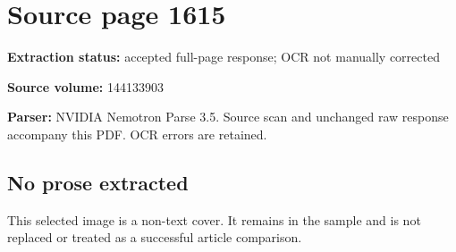 \clearpage
\section{Source page 1615}
\textbf{Extraction status:} accepted full-page response; OCR not manually corrected\par
\textbf{Source volume:} 144133903\par
\textbf{Parser:} NVIDIA Nemotron Parse 3.5. Source scan and unchanged raw response accompany this PDF. OCR errors are retained.\par\medskip
\subsection*{No prose extracted}
This selected image is a non-text cover. It remains in the sample and is not replaced or treated as a successful article comparison.
